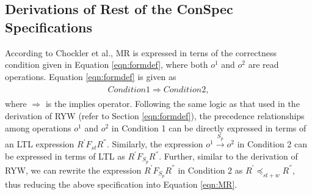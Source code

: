 \documentclass[journal,compsoc]{IEEEtran}
\begin{document}
\subsection{Derivations of Rest of the ConSpec Specifications}\label{sec:restderive}
  According to Chockler et al.,
 MR is expressed in terns of the correctness condition given in Equation \ref{eqn:formdef}, %
 where both $\mathit{o}^1$ and $\mathit{o}^2$ are read operations. 
   Equation \ref{eqn:formdef} is given as \begin{align}\label{eqn:formdef}
\begin{split}
 Condition 1 \Rightarrow Condition 2,
  \end{split}
  \end{align}
 where $\Rightarrow$ is the implies operator. %
   Following the same logic as that used in the derivation of RYW (refer to Section \ref{eqn:formdef}), the precedence relationships among operations $\mathit{o}^1$ and $\mathit{o}^2$ in Condition 1 can be directly
  expressed in terms of an LTL expression
    $R^{'} F_\mathit{st} R^{''} $.   Similarly, the expression $\mathit{o}^1 \xrightarrow{S_p} \mathit{o}^2$ in Condition 2
  can be expressed in terms of LTL as $R^{'} F_{S_p} R^{''}$. 
    Further, similar to the derivation of RYW,  we can rewrite the expression $R^{'} F_{S_p} R^{''} $ in Condition 2 as  $R^{'} \preccurlyeq_{\mathit{st}+w} R^{''}$, thus reducing the above specification  into Equation \ref{eqn:MR}. 
\end{document}
